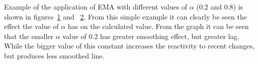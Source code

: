 Example of the application of EMA with different values of $\alpha$ ($0.2$ and $0.8$) is shown in figures~\ref{fig:emaTable} and ~\ref{fig:emaGraph}. From this simple example it can clearly be seen the effect the value of $\alpha$ has on the calculated value. From the graph it can be seen that the smaller $\alpha$ value of $0.2$ has greater smoothing effect, but greater lag. While the bigger value of this constant increases the reactivity to recent changes, but produces less smoothed line.
\begin{figure}[ht]
	\caption{}
	\label{fig:emaTable}
\end{figure}

\begin{figure}[ht]
	\caption{}
	\label{fig:emaGraph}
\end{figure}
\FloatBarrier
